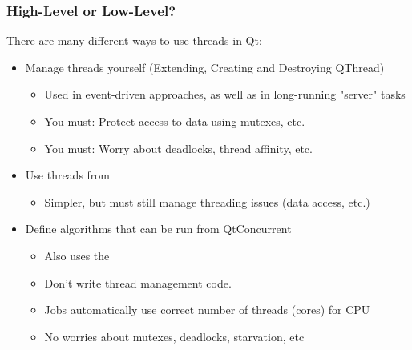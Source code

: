 \begin{slide}
\frametitle{High-Level or Low-Level?}
There are many different ways to use threads in Qt: 
\begin{itemize}
\item Manage threads yourself (Extending, Creating and Destroying QThread)
    \begin{itemize}
        \item Used in event-driven approaches, as well as in long-running
        "server" tasks 
        \item You must: Protect access to data using mutexes, etc.
        \item You must: Worry about deadlocks, thread affinity, etc.
    \end{itemize} 
\item Use threads from 
    \begin{itemize}
        \item Simpler, but must still manage threading issues (data access, etc.)
    \end{itemize}
\item Define algorithms that can be run from QtConcurrent
    \begin{itemize}
    \item Also uses the  
    \item Don't write thread management code.
    \item Jobs automatically use correct number of threads (cores) for CPU
    \item No worries about mutexes, deadlocks, starvation, etc
    \end{itemize}
\end{itemize}
\end{slide}

